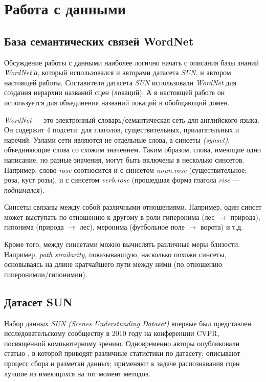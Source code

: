 \section{Работа с данными}


\subsection{База семантических связей WordNet}

\indent
\indent
Обсуждение работы с данными наиболее логично начать с описания базы знаний
\textit{WordNet'а}, который использовался и авторами датасета \textit{SUN},
и автором настоящей работы. Составители датасета \textit{SUN} использовали
\textit{WordNet} для создания иерархии названий сцен (локаций). А в настоящей работе
он используется для объединения названий локаций в обобщающий домен.

\indent
\indent
\textit{WordNet} --- это электронный словарь/семантическая сеть для английского
языка. Он содержит 4 подсети: для глаголов, существительных, прилагательных и
наречий. Узлами сети являются не отдельные слова, а синсеты \textit{(synset)},
объединяющие слова со схожим значением. Таким образом, слова, имеющие
одно написание, но 
разные значения, могут быть включены в несколько синсетов. Например,
слово \textit{rose} соотносится и с синсетом \textit{noun.rose}
(существительное: роза, куст розы),
и с синсетом \textit{verb.rose} (прошедшая форма глагола \textit{rise} --- \textit{поднимался}).

Синсеты связаны между собой различными отношениями. 
Например, один синсет может выступать по отношению к другому в 
роли гиперонима (лес $\rightarrow$ природа), 
гипонима (природа $\rightarrow$ лес),
меронима (футбольное поле $\rightarrow$ ворота) и т.д.

Кроме того, между синсетами можно вычислять различные меры близости.
Например, \textit{path similarity}, показывающую, насколько похожи синсеты, 
основываясь на длине кратчайшего пути между
ними (по отношению гиперонимии/гипонимии).


\subsection{Датасет SUN}

\indent
\indent
Набор данных \textit{SUN (Scenes Understunding Dataset)} впервые был 
представлен исследовательскому сообществу в 2010 году на 
конференции CVPR, посвященной компьютерному зрению. Одновременно
авторы опубликовали статью \cite{sundata}, в которой приводят различные
статистики по датасету; описывают процесс сбора и разметки данных; 
применяют к задаче распознавания сцен лучшие из имеющихся
на тот момент методов. 


